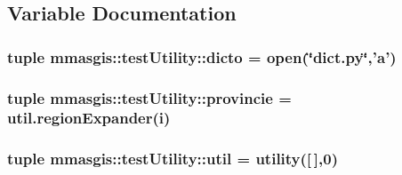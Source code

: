 \subsection{Variable Documentation}
\hypertarget{namespacemmasgis_1_1testUtility_a6ef3c61d001c41fcdedc61c432c90770}{
\subsubsection[{dicto}]{\setlength{\rightskip}{0pt plus 5cm}tuple {\bf mmasgis::testUtility::dicto} = open(\char`\"{}dict.py\char`\"{},'a')}}
\label{namespacemmasgis_1_1testUtility_a6ef3c61d001c41fcdedc61c432c90770}
\hypertarget{namespacemmasgis_1_1testUtility_aaa2a27f2b13bd67a098919dbe91886ae}{
\subsubsection[{provincie}]{\setlength{\rightskip}{0pt plus 5cm}tuple {\bf mmasgis::testUtility::provincie} = util.regionExpander(i)}}
\label{namespacemmasgis_1_1testUtility_aaa2a27f2b13bd67a098919dbe91886ae}
\hypertarget{namespacemmasgis_1_1testUtility_a61e54b1b4b5d077d204f85b32b61237c}{
\subsubsection[{util}]{\setlength{\rightskip}{0pt plus 5cm}tuple {\bf mmasgis::testUtility::util} = {\bf utility}(\mbox{[}$\,$\mbox{]},0)}}
\label{namespacemmasgis_1_1testUtility_a61e54b1b4b5d077d204f85b32b61237c}
